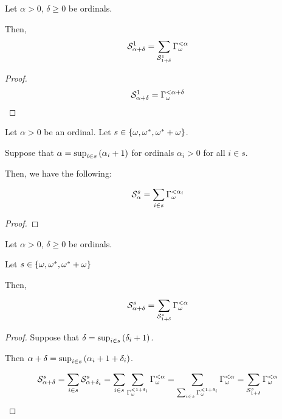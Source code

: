 \begin{corollary}
  Let $\alpha > 0$, $\delta \ge 0$ be ordinals.

  Then,
  \[
    \mathcal{S}^{1}_{\alpha + \delta}
    = \sum_{\mathcal{S}^{1}_{1 + \delta}}{\Gamma_{\omega}^{< \alpha}}
  \]
\end{corollary}

\begin{proof}
  \[
    \mathcal{S}^{1}_{\alpha + \delta}
    = \Gamma_{\omega}^{< \alpha + \delta}
  \]
\end{proof}

\begin{lemma}
  Let $\alpha > 0$ be an ordinal.
  Let $s \in \left\{ {\omega, \omega^\ast, \omega^\ast + \omega} \right\}$.

  Suppose that 
  $\alpha = \sup_{i \in s} \left( {\alpha_i + 1} \right)$ for 
  ordinals $\alpha_i > 0$ for all $i \in s$.

  Then, we have the following:

  \[
    \mathcal{S}^{s}_{\alpha} = \sum_{i \in s}{\Gamma_{\omega}^{< \alpha_i}}
  \]
\end{lemma}

\begin{proof}
  
\end{proof}

\begin{corollary}
  Let $\alpha > 0$, $\delta \ge 0$ be ordinals.

  Let $s \in \left\{ {\omega, \omega^\ast, \omega^\ast + \omega} \right\}$

  Then,

  \[
    \mathcal{S}^{s}_{\alpha + \delta}
    = \sum_{\mathcal{S}^{s}_{1 + \delta}}{\Gamma_{\omega}^{< \alpha}}
  \]
\end{corollary}

\begin{proof}
  Suppose that $\delta = \sup_{i \in s} \left( {\delta_i + 1} \right)$.

  Then $\alpha + \delta = \sup_{i \in s} \left( {\alpha_i + 1 + \delta_i} \right)$.

  \[
    \mathcal{S}^{s}_{\alpha + \delta}
    = \sum_{i \in s}{\mathcal{S}^{s}_{\alpha + \delta_i}}
    = \sum_{i \in s}\sum_{\Gamma_{\omega}^{< 1 + \delta_i}}{\Gamma_{\omega}^{< \alpha}}
    = \sum_{\sum_{i \in s}{\Gamma_{\omega}^{< 1 + \delta_i}}}{\Gamma_{\omega}^{< \alpha}}
    = \sum_{\mathcal{S}^{s}_{1 + \delta}}{\Gamma_{\omega}^{< \alpha}}
  \]
\end{proof}
